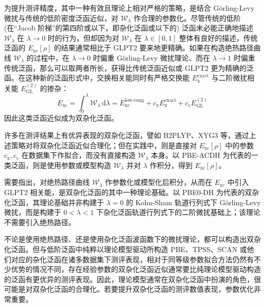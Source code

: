 为提升测评精度，其中一种有效且理论上相对严格的策略，是结合 G\"orling-Levy 微扰与传统的低阶密度泛函近似，对 $\mathcal{W}_{\lambda}$ 作合理的参数化。尽管传统的低阶 (在“Jacob 阶梯”的第四阶或以下，即杂化泛函或以下的) 泛函未必能正确地描述 $\mathcal{W}_{\lambda}$ 在 $\lambda \rightarrow 0$ 时的行为，但却因为对 $\mathcal{W}_{\lambda}$ 在 $\lambda \in [0, 1]$ 整体有良好的描述，传统泛函的 $E_\mathrm{xc} [\rho]$ 的结果通常相比于 GLPT2 要来地更精确。如果在构造绝热路径曲线 $\mathcal{W}_{\lambda}$ 的过程中，在 $\lambda \rightarrow 0$ 时偏重 G\"orling-Levy 微扰理论、而在 $\lambda \rightarrow 1$ 时偏重传统泛函，那么可以取两者所长，获得比传统泛函近似或 GLPT2 更为精确的泛函。在这种新的泛函形式中，交换相关能同时有严格交换能 $E_\mathrm{x}^\mathrm{exact}$ 与二阶微扰相关能 $E_\mathrm{GL}^{(2)}$ 的掺杂：
\begin{equation}
  E_\mathrm{xc} = \int_0^\lambda \mathcal{W}_{\lambda} \, \mathrm{d} \lambda = E_\mathrm{xc}^\text{low-rung} + c_\mathrm{x} E_\mathrm{x}^\mathrm{exact} + c_\mathrm{c} E_\mathrm{GL}^{(2)}
\end{equation}
因此这类泛函近似成为双杂化泛函。

许多在测评结果上有优异表现的双杂化泛函，譬如 B2PLYP、XYG3 等，通过上述策略对将双杂化泛函近似合理化\cite{Grimme-Grimme.JCP.2006, Zhang-Goddard.PNAS.2009}；但在实践中，则是直接对 $E_\mathrm{xc} [\rho]$ 中的参数 $c_\mathrm{x}, c_\mathrm{c}$ 在数据集下作拟合，而没有直接构造 $\mathcal{W}_{\lambda}$ 本身。以 PBE-ACDH\cite{Su-Xu.JCP.2014} 为代表的一类泛函，则是使用参数或模型构造 $\mathcal{W}_{\lambda}$ 并对 $\lambda$ 作积分，得到 $E_\mathrm{xc} [\rho]$。

需要指出，对绝热路径曲线 $\mathcal{W}_{\lambda}$ 作参数化或模型化后积分，从而在 $E_\mathrm{xc}$ 中引入 GLPT2 相关能，是双杂化泛函的其中一种理论基础。以 PBE0-DH\cite{Toulouse-Adamo.JCP.2011} 为代表的双杂化泛函，其理论基础并非构建于 $\lambda = 0$ 的 Kohn-Sham 轨道行列式下 G\"orling-Levy 微扰，而是构建于 $0 < \lambda < 1$ 下杂化泛函轨道行列式下的二阶微扰基础上\cite{Sharkas-Savin.JCP.2011}；该理论不需要引入绝热路径。

不论是使用绝热路径、还是使用杂化泛函波函数下的微扰理论，都可以构造出双杂化泛函。但与低阶泛函中纯粹以理论模型驱动所构造 PBE、TPSS、SCAN 或他们对应的杂化泛函在诸多数据集下测评表现，相对于同等级参数拟合方法仍然有不少优势\cite{Goerigk-Grimme.PCCP.2017, Medvedev-Lyssenko.S.2017}的情况不同，存在经验参数的双杂化泛函近似通常要比纯理论模型驱动构造的泛函有更优异的测评表现\cite{Mehta-Goerigk.PCCP.2018}。因此，理论模型通常在双杂化泛函中扮演的角色，很可能是对双杂化泛函的合理化。若要提升双杂化泛函的测评数值表现，参数优化非常重要。

